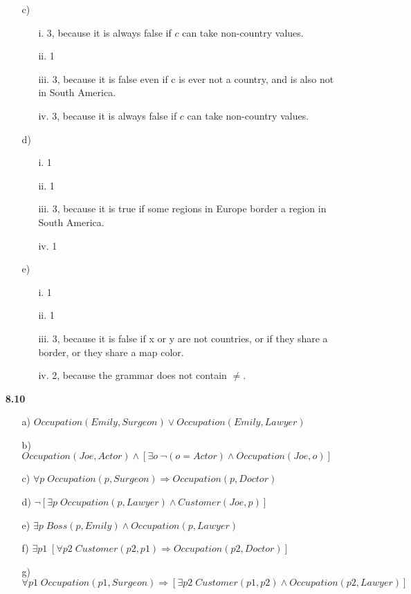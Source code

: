 \documentclass{article}
\begin{document}
\begin{enumerate}
\begin{enumerate}
\item[c)]
\begin{enumerate}
\item[i.] 3, because it is always false if $c$ can take non-country values.
\item[ii.] 1
\item[iii.] 3, because it is false even if c is ever not a country, and is also
not in South America.
\item[iv.] 3, because it is always false if $c$ can take non-country values.
\end{enumerate}

\item[d)]
\begin{enumerate}
\item[i.] 1
\item[ii.] 1
\item[iii.] 3, because it is true if some regions in Europe border a region in
South America.
\item[iv.] 1
\end{enumerate}

\item[e)]
\begin{enumerate}
\item[i.] 1
\item[ii.] 1
\item[iii.] 3, because it is false if x or y are not countries, or if they share
a border, or they share a map color.
\item[iv.] 2, because the grammar does not contain $\ne$.
\end{enumerate}

\end{enumerate}
\item[\textbf{8.10}]
\begin{enumerate}
\item[a)] $Occupation(Emily, Surgeon) \vee Occupation(Emily, Lawyer)$
\item[b)] $Occupation(Joe, Actor) \wedge [\exists o \; \neg(o=Actor) \wedge Occupation(Joe, o)]$
\item[c)] $\forall p \; Occupation(p, Surgeon) \Rightarrow Occupation(p, Doctor)$
\item[d)] $\neg[\exists p \; Occupation(p,Lawyer) \wedge Customer(Joe,p)]$
\item[e)] $\exists p \; Boss(p,Emily) \wedge Occupation(p, Lawyer)$
\item[f)] $\exists p1 \; [\forall p2 \; Customer(p2,p1) \Rightarrow Occupation(p2,Doctor)]$
\item[g)] $\forall p1 \; Occupation(p1,Surgeon) \Rightarrow [\exists p2 \; Customer(p1,p2) \wedge Occupation(p2, Lawyer)]$
\end{enumerate}


\end{enumerate}
\end{document}

